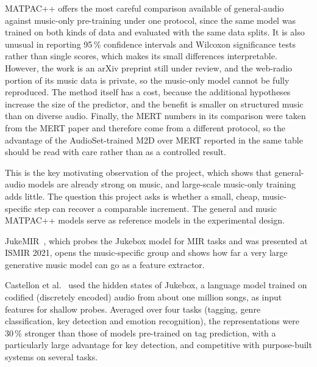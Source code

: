 \documentclass{FastFyp}
\begin{document}
\lrcritical
MATPAC++ offers the most careful comparison available of general-audio against music-only pre-training under one protocol, since the same model was trained on both kinds of data and evaluated with the same data splits. It is also unusual in reporting 95\,\% confidence intervals and Wilcoxon significance tests rather than single scores, which makes its small differences interpretable. However, the work is an arXiv preprint still under review, and the web-radio portion of its music data is private, so the music-only model cannot be fully reproduced. The method itself has a cost, because the additional hypotheses increase the size of the predictor, and the benefit is smaller on structured music than on diverse audio. Finally, the MERT numbers in its comparison were taken from the MERT paper and therefore come from a different protocol, so the advantage of the AudioSet-trained M2D over MERT reported in the same table should be read with care rather than as a controlled result.

\lrrelation
This is the key motivating observation of the project, which shows that general-audio models are already strong on music, and large-scale music-only training adds little. The question this project asks is whether a small, cheap, music-specific step can recover a comparable increment. The general and music MATPAC++ models serve as reference models in the experimental design.

JukeMIR~\cite{ref:Castellon:2021jukemir}, which probes the Jukebox model for MIR tasks and was presented at ISMIR 2021, opens the music-specific group and shows how far a very large generative music model can go as a feature extractor.

\lrsummary
Castellon et al.~\cite{ref:Castellon:2021jukemir} used the hidden states of Jukebox, a language model trained on codified (discretely encoded) audio from about one million songs, as input features for shallow probes. Averaged over four tasks (tagging, genre classification, key detection and emotion recognition), the representations were 30\,\% stronger than those of models pre-trained on tag prediction, with a particularly large advantage for key detection, and competitive with purpose-built systems on several tasks.
\end{document}
